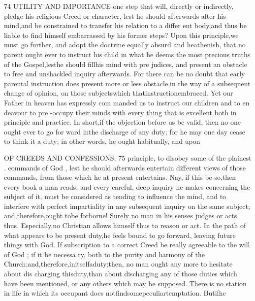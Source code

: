 \documentclass[
]{book}
\begin{document}
74 UTILITY AND IMPORTANCE
one step that will, directly or indirectly, pledge his religious Creed or character, lest he should afterwards alter his mind,and be constrained to transfer his relation to a differ ent body,and thus be liable to find himself embarrassed by his former steps? Upon this principle,we must go further, and adopt the
doctrine equally absurd and heathenish, that no parent ought ever to instruct his child in
what he deems the most precious truths of the Gospel,lesthe should fillhis mind with pre judices, and present an obstacle to free and
unshackled inquiry afterwards. For there can be no doubt that early parental instruction does present more or less obstacle,in the way of a subsequent change of opinion, on those subjectswhich thatinstructionembraced. Yet our Father in heaven has expressly com manded us to instruct our children and to en deavour to pre -occupy their minds with every thing that is excellent both in principle and practice. In short,if the objection before us be valid, then no one ought ever to go for ward inthe discharge of any duty; for he
may one day cease to think it a duty; in other words, he ought habitually, and upon

OF CREEDS AND CONFESSIONS. 75
principle, to disobey some of the plainest . commands of God , lest he should afterwards entertain different views of those commands, from those which he at present entertains. Nay, if this be so,then every book a man reads, and every careful, deep inquiry he makes concerning the subject of it, must be considered as tending to influence the mind, and to interfere with perfect impartiality in
any subsequent inquiry on the same subject; and,therefore,ought tobe forborne!
Surely no man in his senses judges or acts thus. Especially,no Christian allows himself thus to reason or act. In the path of what
appears to be present duty,he feels bound to
go forward, leaving future things with God.
If subscription to a correct Creed be really
agreeable to the will of God ; if it be necessa
ry, both to the purity and harmony of the
Church;and,therefore,initselfaduty;then,
no man ought any more to hesitate about dis
charging thisduty,than about discharging any
of those duties which have been mentioned,
or any others which may be supposed. There is no station in life in which its occupant does
notfindsomepeculiartemptation. Butifhe
\end{document}

